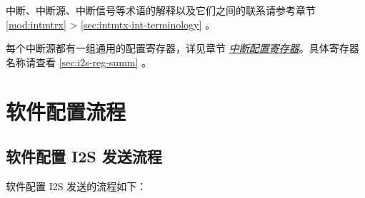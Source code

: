 \documentclass[main\_\_CN.tex]{subfiles}
\begin{document}
\begin{tiplisting}
中断、中断源、中断信号等术语的解释以及它们之间的联系请参考章节 \ref{mod:intmtrx} \textit{} > \ref{sec:intmtx-int-terminology} \textit{}。
\end{tiplisting}

每个中断源都有一组通用的配置寄存器，详见章节 \hyperref[interrupt-config-registers]{\textit{中断配置寄存器}}。具体寄存器名称请查看 \ref{sec:i2s-reg-summ} \textit{}。

\section{软件配置流程}
\subsection{软件配置 I2S 发送流程}\label{sec:i2s-configure-i2s-tx-mode}

软件配置 I2S 发送的流程如下：
\end{document}
